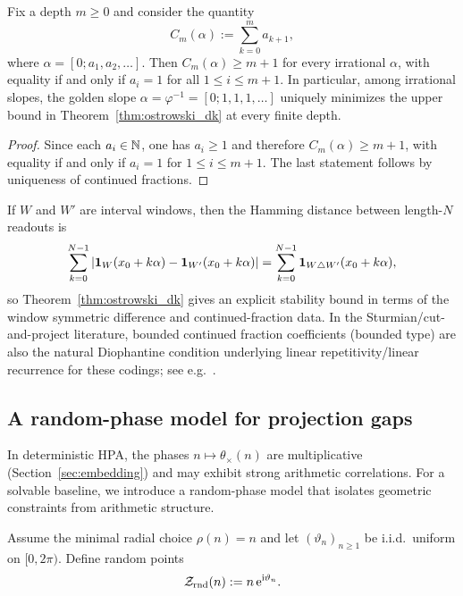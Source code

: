 \begin{corollary}
\label{cor:golden_optimal_discrepancy_proxy}
Fix a depth $m\ge 0$ and consider the quantity
$$
C_m(\alpha):=\sum_{k=0}^{m} a_{k+1},
$$
where $\alpha=[0;a_1,a_2,\dots]$.
Then $C_m(\alpha)\ge m+1$ for every irrational $\alpha$, with equality if and only if $a_i=1$ for all $1\le i\le m+1$.
In particular, among irrational slopes, the golden slope $\alpha=\varphi^{-1}=[0;1,1,1,\dots]$ uniquely minimizes the upper bound in Theorem~\ref{thm:ostrowski_dk} at every finite depth.
\end{corollary}

\begin{proof}
Since each $a_i\in\mathbb{N}$, one has $a_i\ge 1$ and therefore $C_m(\alpha)\ge m+1$, with equality if and only if $a_i=1$ for $1\le i\le m+1$.
The last statement follows by uniqueness of continued fractions.
\end{proof}

\begin{remark}
If $W$ and $W'$ are interval windows, then the Hamming distance between length-$N$ readouts is
$$
\sum_{k=0}^{N-1} |\mathbf{1}_W(x_0+k\alpha)-\mathbf{1}_{W'}(x_0+k\alpha)|
=\sum_{k=0}^{N-1}\mathbf{1}_{W\triangle W'}(x_0+k\alpha),
$$
so Theorem~\ref{thm:ostrowski_dk} gives an explicit stability bound in terms of the window symmetric difference and continued-fraction data.
In the Sturmian/cut-and-project literature, bounded continued fraction coefficients (bounded type) are also the natural Diophantine condition underlying linear repetitivity/linear recurrence for these codings; see e.g.~\cite{LagariasPleasants2003,BugeaudLaurent2005}.
\end{remark}

\subsection{A random-phase model for projection gaps}
In deterministic HPA, the phases $n\mapsto\theta_\times(n)$ are multiplicative (Section~\ref{sec:embedding}) and may exhibit strong arithmetic correlations.
For a solvable baseline, we introduce a random-phase model that isolates geometric constraints from arithmetic structure.

\begin{assumption}
\label{ass:random_phase_model}
Assume the minimal radial choice $\rho(n)=n$ and let $(\vartheta_n)_{n\ge 1}$ be i.i.d.\ uniform on $[0,2\pi)$.
Define random points
$$
\mathcal{Z}_{\mathrm{rnd}}(n):=n\,\mathrm{e}^{\mathrm{i}\vartheta_n}.
$$
\end{assumption}

